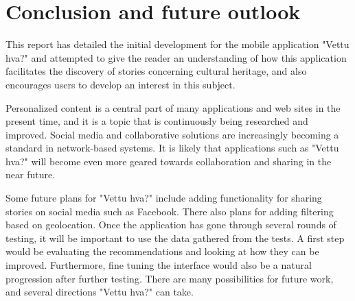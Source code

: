 
\chapter{Conclusion and future outlook}

This report has detailed the initial development for the mobile application "Vettu hva?" and attempted to give the reader an understanding of how this application facilitates the discovery of stories concerning cultural heritage, and also encourages users to develop an interest in this subject.\newline

Personalized content is a central part of many applications and web sites in the present time, and it is a topic that is continuously being researched and improved. Social media and collaborative solutions are increasingly becoming a standard in network-based systems. It is likely that applications such as "Vettu hva?" will become even more geared towards collaboration and sharing in the near future.\newline

Some future plans for "Vettu hva?" include adding functionality for sharing stories on social media such as Facebook. There also plans for adding filtering based on geolocation. Once the application has gone through several rounds of testing, it will be important to use the data gathered from the tests. A first step would be evaluating the recommendations and looking at how they can be improved. Furthermore, fine tuning the interface would also be a natural progression after further testing. There are many possibilities for future work, and several directions "Vettu hva?" can take.


\cleardoublepage